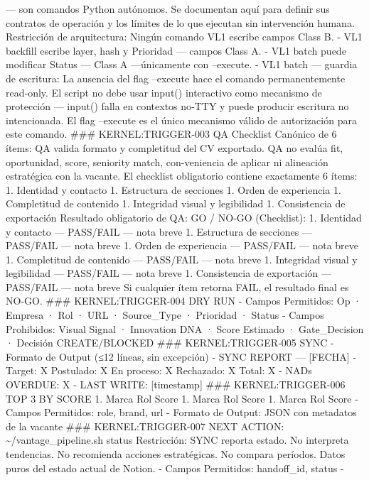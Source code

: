 \documentclass[
]{article}
\begin{document}
--- son comandos Python autónomos. Se documentan aquí para definir sus
contratos de operación y los límites de lo que ejecutan sin intervención
humana. Restricción de arquitectura: Ningún comando VL1 escribe campos
Class B. - VL1 backfill escribe layer, hash y Prioridad --- campos Class
A. - VL1 batch puede modificar Status --- Class A ---únicamente con
--execute. - VL1 batch --- guardia de escritura: La ausencia del flag
--execute hace el comando permanentemente read‑only. El script no debe
usar input() interactivo como mecanismo de protección --- input() falla
en contextos no‑TTY y puede producir escritura no intencionada. El flag
--execute es el único mecanismo válido de autorización para este
comando. \#\#\# KERNEL:TRIGGER-003 QA Checklist Canónico de 6 ítems: QA
valida formato y completitud del CV exportado. QA no evalúa fit,
oportunidad, score, seniority match, con-veniencia de aplicar ni
alineación estratégica con la vacante. El checklist obligatorio contiene
exactamente 6 ítems: 1. Identidad y contacto 1. Estructura de secciones
1. Orden de experiencia 1. Completitud de contenido 1. Integridad visual
y legibilidad 1. Consistencia de exportación Resultado obligatorio de
QA: GO / NO-GO (Checklist): 1. Identidad y contacto --- PASS/FAIL ---
nota breve 1. Estructura de secciones --- PASS/FAIL --- nota breve 1.
Orden de experiencia --- PASS/FAIL --- nota breve 1. Completitud de
contenido --- PASS/FAIL --- nota breve 1. Integridad visual y
legibilidad --- PASS/FAIL --- nota breve 1. Consistencia de exportación
--- PASS/FAIL --- nota breve Si cualquier ítem retorna FAIL, el
resultado final es NO‑GO. \#\#\# KERNEL:TRIGGER-004 DRY RUN - Campos
Permitidos: Op · Empresa · Rol · URL · Source\_Type · Prioridad · Status
- Campos Prohibidos: Visual Signal · Innovation DNA · Score Estimado ·
Gate\_Decision · Decisión CREATE/BLOCKED \#\#\# KERNEL:TRIGGER-005 SYNC
- Formato de Output (≤12 líneas, sin excepción) - SYNC REPORT ---
{[}FECHA{]} - Target: X \textbar{} Postulado: X \textbar{} En proceso: X
\textbar{} Rechazado: X \textbar{} Total: X - NADs OVERDUE: X - LAST
WRITE: {[}timestamp{]} \#\#\# KERNEL:TRIGGER-006 TOP 3 BY SCORE 1. Marca
\textbar{} Rol \textbar{} Score 1. Marca \textbar{} Rol \textbar{} Score
1. Marca \textbar{} Rol \textbar{} Score - Campos Permitidos: role,
brand, url - Formato de Output: JSON con metadatos de la vacante \#\#\#
KERNEL:TRIGGER-007 NEXT ACTION: \textasciitilde/vantage\_pipeline.sh
status Restricción: SYNC reporta estado. No interpreta tendencias. No
recomienda acciones estratégicas. No compara períodos. Datos puros del
estado actual de Notion. - Campos Permitidos: handoff\_id, status -
\end{document}

